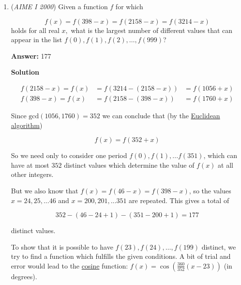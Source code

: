\begin{enumerate}
 
If the denominator is in the form $2^k5^j$, where $k\ge 1$ and $j\ge 1$, the numerator must be $1$. We can get the sum of all such fractions from $(\frac{1}{2}+\frac{1}{4}+\frac{1}{8})(\frac{1}{5}+\frac{1}{25}+\frac{1}{125}) = \frac{217}{1000}$.

 
Adding, we get $2480$, with a bit extra, so our answer is $\boxed{248}$.

 


	\item (\textit{AIME I 2000}) Given a function $f$ for which

 \[f(x) = f(398 - x) = f(2158 - x) = f(3214 - x)\]
holds for all real $x,$ what is the largest number of different values that can appear in the list $f(0),f(1),f(2),\ldots,f(999)$?


 
 \textbf{Answer: }177



\textbf{Solution}


 \begin{align*}f(2158 - x) = f(x) &= f(3214 - (2158 - x)) &= f(1056 + x)\\ f(398 - x) = f(x) &= f(2158 - (398 - x)) &= f(1760 + x)\end{align*}


 Since $\mathrm{gcd}(1056, 1760) = 352$ we can conclude that (by the \href{https://artofproblemsolving.com/wiki/index.php?title=Euclidean\_algorithm}{Euclidean algorithm})

 
 \[f(x) = f(352 + x)\]

 So we need only to consider one period $f(0), f(1), ... f(351)$, which can have at most $352$ distinct values which determine the value of $f(x)$ at all other integers.  

 But we also know that $f(x) = f(46 - x) = f(398 - x)$, so the values $x = 24, 25, ... 46$ and $x = 200, 201, ... 351$ are repeated.  This gives a total of

 
 \[352 - (46 - 24 + 1) - (351 - 200 + 1) = \boxed{ 177 }\]

 distinct values.

 To show that it is possible to have $f(23), f(24), \ldots, f(199)$ distinct, we try to find a function which fulfills the given conditions. A bit of trial and error would lead to the \href{https://artofproblemsolving.com/wiki/index.php?title=Cosine}{cosine} function: $f(x) = \cos \left(\frac{360}{352}(x-23)\right)$ (in degrees).

 




\end{enumerate}
